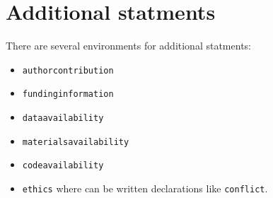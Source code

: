 \documentclass[namedreferences,hyperref,optionalrh,solaromanenum]{spr-sola}
\begin{document}
\section{Additional statments}

There are several environments for additional statments: 
\begin{itemize}
\item \texttt{authorcontribution}
\item \texttt{fundinginformation}
\item \texttt{dataavailability}
\item \texttt{materialsavailability}
\item \texttt{codeavailability}
\item \texttt{ethics} where can be written declarations like \texttt{conflict}.
\end{itemize}
 
 
\end{document}
